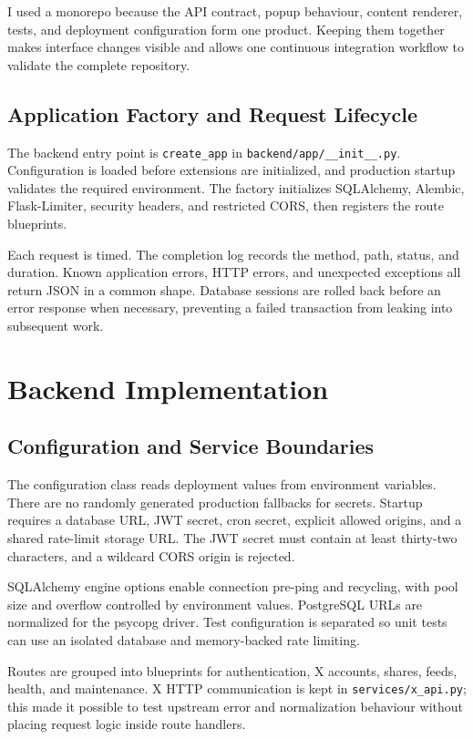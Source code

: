 \documentclass[11pt,a4paper]{report}
\newcommand{\code}[1]{\texttt{#1}}
\begin{document}
I used a monorepo because the API contract, popup behaviour, content renderer,
tests, and deployment configuration form one product. Keeping them together
makes interface changes visible and allows one continuous integration workflow
to validate the complete repository.

\section{Application Factory and Request Lifecycle}
The backend entry point is \code{create\_app} in
\code{backend/app/\_\_init\_\_.py}. Configuration is loaded before extensions
are initialized, and production startup validates the required environment.
The factory initializes SQLAlchemy, Alembic, Flask-Limiter, security headers,
and restricted CORS, then registers the route blueprints.

Each request is timed. The completion log records the method, path, status, and
duration. Known application errors, HTTP errors, and unexpected exceptions all
return JSON in a common shape. Database sessions are rolled back before an
error response when necessary, preventing a failed transaction from leaking
into subsequent work.

\chapter{Backend Implementation}

\section{Configuration and Service Boundaries}
The configuration class reads deployment values from environment variables.
There are no randomly generated production fallbacks for secrets. Startup
requires a database URL, JWT secret, cron secret, explicit allowed origins, and
a shared rate-limit storage URL. The JWT secret must contain at least
thirty-two characters, and a wildcard CORS origin is rejected.

SQLAlchemy engine options enable connection pre-ping and recycling, with pool
size and overflow controlled by environment values. PostgreSQL URLs are
normalized for the psycopg driver. Test configuration is separated so unit
tests can use an isolated database and memory-backed rate limiting.

Routes are grouped into blueprints for authentication, X accounts, shares,
feeds, health, and maintenance. X HTTP communication is kept in
\code{services/x\_api.py}; this made it possible to test upstream error and
normalization behaviour without placing request logic inside route handlers.
\end{document}
